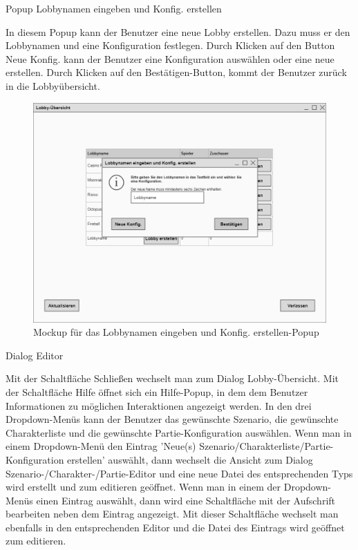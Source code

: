 Popup \glqq{}Lobbynamen eingeben und Konfig. erstellen\grqq{}

In diesem Popup kann der Benutzer eine neue Lobby erstellen. Dazu muss er den Lobbynamen und eine Konfiguration festlegen. Durch Klicken auf den Button Neue Konfig. kann der Benutzer eine Konfiguration auswählen oder eine neue erstellen. Durch Klicken auf den Bestätigen-Button, kommt der Benutzer zurück in die Lobbyübersicht.

\begin{figure}
  \centering
  \includegraphics[width=\textwidth]{Meilenstein03/LobbynamenEingebenUndKonfigErstellen_Mockup.png}
  \caption{Mockup für das Lobbynamen eingeben und Konfig. erstellen-Popup}
\end{figure}

Dialog \glqq{}Editor\grqq{}

Mit der Schaltfläche \glqq{}Schließen\grqq{} wechselt man zum Dialog \glqq{}Lobby-Übersicht\grqq{}.
Mit der Schaltfläche \glqq{}Hilfe\grqq{} öffnet sich ein Hilfe-Popup, in dem dem Benutzer Informationen zu möglichen Interaktionen angezeigt werden.
In den drei Dropdown-Menüs kann der Benutzer das gewünschte Szenario, die gewünschte Charakterliste und die gewünschte Partie-Konfiguration auswählen. Wenn man in einem Dropdown-Menü den Eintrag 'Neue(s) Szenario/Charakterliste/Partie-Konfiguration erstellen' auswählt, dann wechselt die Ansicht zum Dialog \glqq{}Szenario-/Charakter-/Partie-Editor\grqq{} und eine neue Datei des entsprechenden Typs wird erstellt und zum editieren geöffnet.
Wenn man in einem der Dropdown-Menüs einen Eintrag auswählt, dann wird eine Schaltfläche mit der Aufschrift \glqq{}bearbeiten\grqq{} neben dem Eintrag angezeigt. Mit dieser Schaltfläche wechselt man ebenfalls in den entsprechenden Editor und die Datei des Eintrags wird geöffnet zum editieren.

